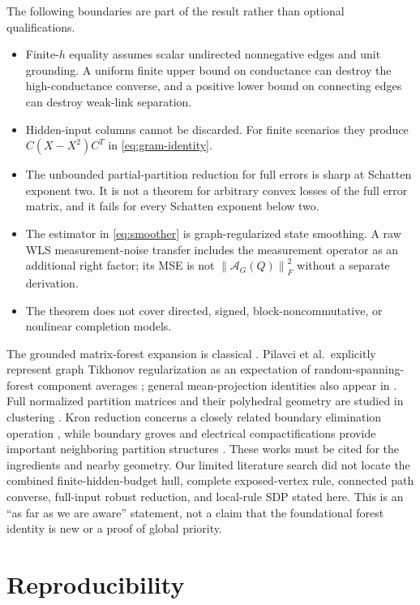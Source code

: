 \documentclass[journal,10pt]{IEEEtran}
\theoremstyle{definition}
\theoremstyle{remark}
\newcommand{\cA}{\mathcal A}
\newcommand{\norm}[1]{\left\lVert #1\right\rVert}
\begin{document}
The following boundaries are part of the result rather than optional
qualifications.

\begin{itemize}[leftmargin=1.5em]
\item Finite-$h$ equality assumes scalar undirected nonnegative edges and unit
grounding.  A uniform finite upper bound on conductance can destroy the
high-conductance converse, and a positive lower bound on connecting edges can
destroy weak-link separation.
\item Hidden-input columns cannot be discarded.  For finite scenarios they
produce $C(X-X^2)C^T$ in \eqref{eq:gram-identity}.
\item The unbounded partial-partition reduction for full errors is sharp at
Schatten exponent two.  It is not a theorem for arbitrary convex losses of the
full error matrix, and it fails for every Schatten exponent below two.
\item The estimator in \eqref{eq:smoother} is graph-regularized state
smoothing.  A raw WLS measurement-noise transfer includes the measurement
operator as an additional right factor; its MSE is not
$\norm{\cA_G(Q)}_F^2$ without a separate derivation.
\item The theorem does not cover directed, signed, block-noncommutative, or
nonlinear completion models.
\end{itemize}

The grounded matrix-forest expansion is classical
\cite{chebotarev1997}.  Pilavci et al.\ explicitly represent graph Tikhonov
regularization as an expectation of random-spanning-forest component averages
\cite{pilavci2021}; general mean-projection identities also appear in
\cite{derezinski2020,kassel2023}.  Full normalized partition matrices and
their polyhedral geometry are studied in clustering
\cite{derosa2022}.  Kron reduction concerns a closely related boundary
elimination operation \cite{dorfler2013}, while boundary groves and electrical
compactifications provide important neighboring partition structures
\cite{kenyon2011,lam2018}.  These works must be cited for the ingredients and
nearby geometry.  Our limited literature search did not locate the combined
finite-hidden-budget hull, complete exposed-vertex rule, connected path
converse, full-input robust reduction, and local-rule SDP stated here.  This is
an ``as far as we are aware'' statement, not a claim that the foundational
forest identity is new or a proof of global priority.

\section{Reproducibility}
\end{document}
